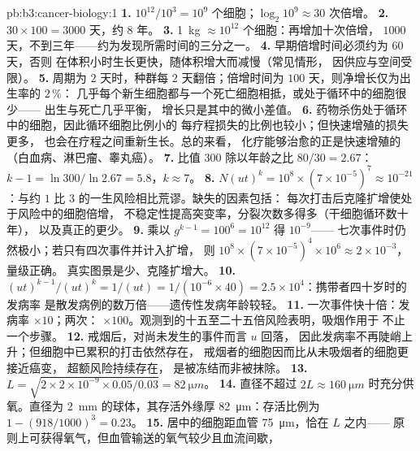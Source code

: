 \begin{solution}{pb:b3:cancer-biology:1}
\textbf{1.} $10^{12}/10^{3} = 10^{9}$ 个细胞；$\log_{2}10^{9} \approx 30$
次倍增。
\textbf{2.} $30\times 100 = 3000$ 天，约 $8$ 年。
\textbf{3.} \qty{1}{kg} $\approx 10^{12}$ 个细胞：再增加十次倍增，
$1000$ 天，不到三年——约为发现所需时间的三分之一。
\textbf{4.} 早期倍增时间必须约为 $60$ 天，否则
在体积小时生长更快，随体积增大而减慢（常见情形，
因供应与空间受限）。
\textbf{5.} 周期为 $2$ 天时，种群每 $2$
天翻倍；倍增时间为 $100$ 天，则净增长仅为出生率的 $2\,\%$：
几乎每个新生细胞都与一个死亡细胞相抵，或处于循环中的细胞很少——
出生与死亡几乎平衡，
增长只是其中的微小差值。
\textbf{6.} 药物杀伤处于循环中的细胞，因此循环细胞比例小的
每疗程损失的比例也较小；但快速增殖的损失更多，
也会在疗程之间重新生长。总的来看，
化疗能够治愈的正是快速增殖的
（白血病、淋巴瘤、睾丸癌）。
\textbf{7.} 比值 $300$ 除以年龄之比 $80/30 = 2.67$：$k - 1 =
\ln 300/\ln 2.67 = 5.8$，$k \approx 7$。
\textbf{8.} $N(ut)^{k} = 10^{8}\times (7\times 10^{-5})^{7} \approx
10^{-21}$：与约 $1$ 比 $3$ 的一生风险相比荒谬。缺失的因素包括：
每次打击后克隆扩增使处于风险中的细胞倍增，
不稳定性提高突变率，分裂次数多得多（干细胞循环数十年），
以及真正的更少。
\textbf{9.} 乘以 $g^{k-1} = 100^{6} = 10^{12}$ 得 $10^{-9}$——
七次事件时仍然极小；若只有四次事件并计入扩增，
则 $10^{8}\times (7\times 10^{-5})^{4}\times 10^{6} \approx 2\times
10^{-3}$，量级正确。
真实图景是少、克隆扩增大。
\textbf{10.} $(ut)^{k-1}/(ut)^{k} = 1/(ut) = 1/(10^{-6}\times 40) =
2.5\times 10^{4}$：携带者四十岁时的发病率
是散发病例的数万倍——遗传性发病年龄较轻。
\textbf{11.} 一次事件快十倍：发病率 $\times 10$；两次：
$\times 100$。观测到的十五至二十五倍风险表明，吸烟作用于
不止一个步骤。
\textbf{12.} 戒烟后，对尚未发生的事件而言 $u$ 回落，
因此发病率不再陡峭上升；但细胞中已累积的打击依然存在，
戒烟者的细胞因而比从未吸烟者的细胞更接近癌变，
超额风险持续存在，
是被冻结而非被抹除。
\textbf{13.} $L = \sqrt{2\times 2\times 10^{-9}\times 0.05/0.03} =
\qty{82}{\micro m}$。
\textbf{14.} 直径不超过 $2L \approx
\qty{160}{\micro m}$ 时充分供氧。直径为 \qty{2}{mm} 的球体，其存活外缘厚
\qty{82}{\micro m}：存活比例为 $1 - (918/1000)^{3} = 0.23$。
\textbf{15.} 居中的细胞距血管 \qty{75}{\micro m}，恰在 $L$ 之内——
原则上可获得氧气，但血管输送的氧气较少且血流间歇，

\end{solution}
